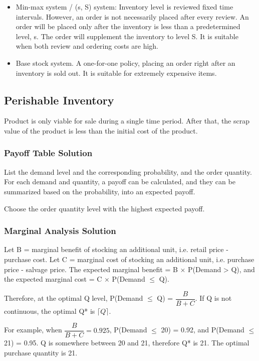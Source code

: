 \documentclass{article}
\begin{document}
\begin{itemize}
	\item Min-max system / (s, S) system:
	      Inventory level is reviewed fixed time intervals.
	      However, an order is not necessarily placed after every review.
	      An order will be placed only after the inventory is less than a predetermined level, s.
	      The order will supplement the inventory to level S.
	      It is suitable when both review and ordering costs are high.
	\item Base stock system. A one-for-one policy, placing an order right after an inventory is sold out.
	      It is suitable for extremely expensive items.
\end{itemize}

\subsection{Perishable Inventory}

Product is only viable for sale during a single time period.
After that, the scrap value of the product is less than the initial cost of the product.

\subsubsection{Payoff Table Solution}

List the demand level and the corresponding probability, and the order quantity.
For each demand and quantity, a payoff can be calculated,
and they can be summarized based on the probability, into an expected payoff.

Choose the order quantity level with the highest expected payoff.

\subsubsection{Marginal Analysis Solution}

Let B = marginal benefit of stocking an additional unit, i.e. retail price - purchase cost.
Let C = marginal cost of stocking an additional unit, i.e. purchase price - salvage price.
The expected marginal benefit = B $\times$ P(Demand > Q),
and the expected marginal cost = C $\times$ P(Demand $\leq$ Q).

Therefore, at the optimal Q level, P(Demand $\leq$ Q) = $\dfrac{B}{B+C}$.
If Q is not continuous, the optimal Q* is $\lceil Q \rceil$.

For example, when $\dfrac{B}{B+C} = 0.925$, P(Demand $\leq$ 20) = 0.92,
and P(Demand $\leq$ 21) = 0.95.
Q is somewhere between 20 and 21, therefore Q* is 21.
The optimal purchase quantity is 21.
\end{document}
